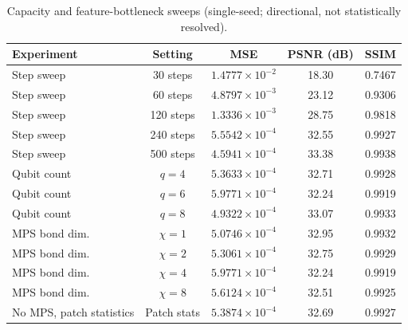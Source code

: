 \documentclass[journal]{IEEEtran}
\begin{document}
\begin{table}[t]
\centering
\caption{Capacity and feature-bottleneck sweeps (single-seed; directional, not statistically resolved).}
\label{tab:capacity_ablation}
\scriptsize
\begin{tabular}{lcccc}
\toprule
Experiment & Setting & MSE & PSNR (dB) & SSIM \\
\midrule
Step sweep & 30 steps & $1.4777\times10^{-2}$ & 18.30 & 0.7467 \\
Step sweep & 60 steps & $4.8797\times10^{-3}$ & 23.12 & 0.9306 \\
Step sweep & 120 steps & $1.3336\times10^{-3}$ & 28.75 & 0.9818 \\
Step sweep & 240 steps & $5.5542\times10^{-4}$ & 32.55 & 0.9927 \\
Step sweep & 500 steps & $4.5941\times10^{-4}$ & 33.38 & 0.9938 \\
Qubit count & $q=4$ & $5.3633\times10^{-4}$ & 32.71 & 0.9928 \\
Qubit count & $q=6$ & $5.9771\times10^{-4}$ & 32.24 & 0.9919 \\
Qubit count & $q=8$ & $4.9322\times10^{-4}$ & 33.07 & 0.9933 \\
MPS bond dim. & $\chi=1$ & $5.0746\times10^{-4}$ & 32.95 & 0.9932 \\
MPS bond dim. & $\chi=2$ & $5.3061\times10^{-4}$ & 32.75 & 0.9929 \\
MPS bond dim. & $\chi=4$ & $5.9771\times10^{-4}$ & 32.24 & 0.9919 \\
MPS bond dim. & $\chi=8$ & $5.6124\times10^{-4}$ & 32.51 & 0.9925 \\
No MPS, patch statistics & Patch stats & $5.3874\times10^{-4}$ & 32.69 & 0.9927 \\
\bottomrule
\end{tabular}
\end{table}

\begin{table}[t]
\centering
\caption{Capacity and resource comparison for the held-out CIFAR validation layer. All rows use the same linear readout width and split protocol.}
\label{tab:resource_capacity}
\scriptsize
{}
\end{table}
\end{document}
